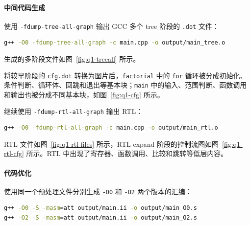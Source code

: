

\paragraph{中间代码生成}

使用 \texttt{-fdump-tree-all-graph} 输出 GCC 多个 tree 阶段的 \texttt{.dot} 文件：

\begin{lstlisting}[language=bash]
g++ -O0 -fdump-tree-all-graph -c main.cpp -o output/main_tree.o
\end{lstlisting}

生成的多阶段文件如图~\ref{fig:q1-treeall} 所示。


将较早阶段的 \texttt{cfg.dot} 转换为图片后，\texttt{factorial} 中的 \texttt{for} 循环被分成初始化、条件判断、循环体、回跳和退出等基本块；\texttt{main} 中的输入、范围判断、函数调用和输出也被分成不同基本块，如图~\ref{fig:q1-cfg} 所示。


继续使用 \texttt{-fdump-rtl-all-graph} 输出 RTL：

\begin{lstlisting}[language=bash]
g++ -O0 -fdump-rtl-all-graph -c main.cpp -o output/main_rtl.o
\end{lstlisting}

RTL 文件如图~\ref{fig:q1-rtl-files} 所示，RTL expand 阶段的控制流图如图~\ref{fig:q1-rtl-cfg} 所示。RTL 中出现了寄存器、函数调用、比较和跳转等低层内容。



\paragraph{代码优化}

使用同一个预处理文件分别生成 \texttt{-O0} 和 \texttt{-O2} 两个版本的汇编：

\begin{lstlisting}[language=bash]
g++ -O0 -S -masm=att output/main.ii -o output/main_O0.s
g++ -O2 -S -masm=att output/main.ii -o output/main_O2.s
\end{lstlisting}


